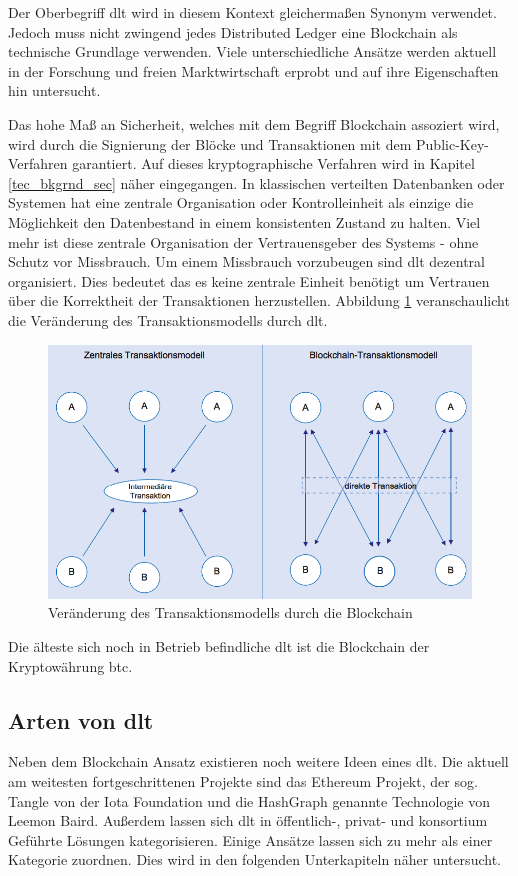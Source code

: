 Der Oberbegriff \acf{dlt} wird in diesem Kontext gleichermaßen Synonym verwendet. Jedoch muss nicht zwingend jedes \glqq Distributed Ledger\grqq{} eine Blockchain als technische Grundlage verwenden. Viele unterschiedliche Ansätze werden aktuell in der Forschung und freien Marktwirtschaft erprobt und auf ihre Eigenschaften hin untersucht.\cite[Vgl.]{Mitschele2018}

Das hohe Maß an Sicherheit, welches mit dem Begriff Blockchain assoziert wird, wird durch die Signierung der Blöcke und Transaktionen mit dem Public-Key-Verfahren garantiert. Auf dieses kryptographische Verfahren wird in Kapitel \ref{tec_bkgrnd_sec} näher eingegangen. In klassischen verteilten Datenbanken oder Systemen hat eine zentrale Organisation oder Kontrolleinheit als einzige die Möglichkeit den Datenbestand in einem konsistenten Zustand zu halten. Viel mehr ist diese zentrale Organisation der Vertrauensgeber des Systems - ohne Schutz vor Missbrauch. Um einem Missbrauch vorzubeugen sind \ac{dlt} dezentral organisiert. Dies bedeutet das es keine zentrale Einheit benötigt um Vertrauen über die Korrektheit der Transaktionen herzustellen.\cite[Vgl.]{Welzel2017} Abbildung \ref{fig:change-in-transaction-model-blockchain} veranschaulicht die Veränderung des Transaktionsmodells durch \ac{dlt}.
\begin{figure}[h!]
	\centering
    \includegraphics[width=0.76\linewidth]{pictures/change-in-transaction-model-blockchain}
	\caption[Veränderung des Transaktionsmodells durch die Blockchain]{Veränderung des Transaktionsmodells durch die Blockchain\cite{Kastrati2016}}
	\label{fig:change-in-transaction-model-blockchain}
\end{figure}

Die älteste sich noch in Betrieb befindliche \ac{dlt} ist die Blockchain der Kryptowährung \ac{btc}.

\subsection{Arten von \acl{dlt}}
Neben dem Blockchain Ansatz existieren noch weitere Ideen eines \ac{dlt}. Die aktuell am weitesten fortgeschrittenen Projekte sind das Ethereum Projekt, der sog. \glqq Tangle\grqq{} von der Iota Foundation und die \glqq HashGraph\grqq{} genannte Technologie von Leemon Baird.\cite{Baird2016} Außerdem lassen sich \ac{dlt} in öffentlich-, privat- und konsortium Geführte Lösungen kategorisieren. Einige Ansätze lassen sich zu mehr als einer Kategorie zuordnen. Dies wird in den folgenden Unterkapiteln näher untersucht.

